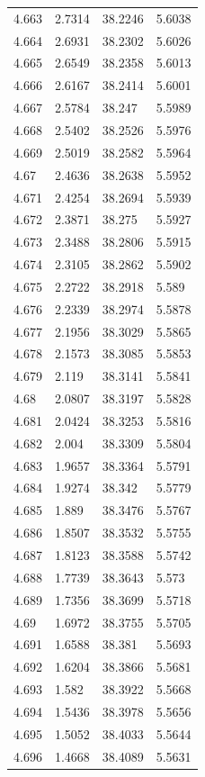 \begin{tabular}{llll}
4.663 & 2.7314 & 38.2246 & 5.6038 \\
4.664 & 2.6931 & 38.2302 & 5.6026 \\
4.665 & 2.6549 & 38.2358 & 5.6013 \\
4.666 & 2.6167 & 38.2414 & 5.6001 \\
4.667 & 2.5784 & 38.247 & 5.5989 \\
4.668 & 2.5402 & 38.2526 & 5.5976 \\
4.669 & 2.5019 & 38.2582 & 5.5964 \\
4.67 & 2.4636 & 38.2638 & 5.5952 \\
4.671 & 2.4254 & 38.2694 & 5.5939 \\
4.672 & 2.3871 & 38.275 & 5.5927 \\
4.673 & 2.3488 & 38.2806 & 5.5915 \\
4.674 & 2.3105 & 38.2862 & 5.5902 \\
4.675 & 2.2722 & 38.2918 & 5.589 \\
4.676 & 2.2339 & 38.2974 & 5.5878 \\
4.677 & 2.1956 & 38.3029 & 5.5865 \\
4.678 & 2.1573 & 38.3085 & 5.5853 \\
4.679 & 2.119 & 38.3141 & 5.5841 \\
4.68 & 2.0807 & 38.3197 & 5.5828 \\
4.681 & 2.0424 & 38.3253 & 5.5816 \\
4.682 & 2.004 & 38.3309 & 5.5804 \\
4.683 & 1.9657 & 38.3364 & 5.5791 \\
4.684 & 1.9274 & 38.342 & 5.5779 \\
4.685 & 1.889 & 38.3476 & 5.5767 \\
4.686 & 1.8507 & 38.3532 & 5.5755 \\
4.687 & 1.8123 & 38.3588 & 5.5742 \\
4.688 & 1.7739 & 38.3643 & 5.573 \\
4.689 & 1.7356 & 38.3699 & 5.5718 \\
4.69 & 1.6972 & 38.3755 & 5.5705 \\
4.691 & 1.6588 & 38.381 & 5.5693 \\
4.692 & 1.6204 & 38.3866 & 5.5681 \\
4.693 & 1.582 & 38.3922 & 5.5668 \\
4.694 & 1.5436 & 38.3978 & 5.5656 \\
4.695 & 1.5052 & 38.4033 & 5.5644 \\
4.696 & 1.4668 & 38.4089 & 5.5631 \\

\end{tabular}
